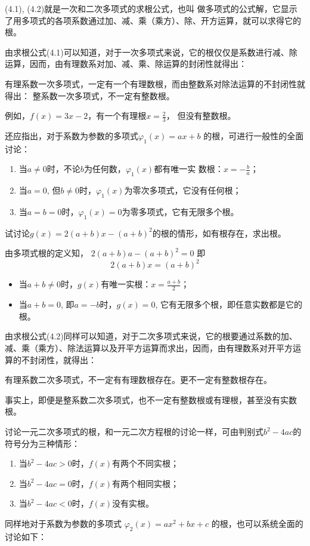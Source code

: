 (4.1), (4.2)就是一次和二次多项式的求根公式，也叫
做多项式的公式解，它显示了用多项式的各项系数通过加、减、乘（乘方）、除、开方运算，就可以求得它的根。

由求根公式(4.1)可以知道，对于一次多项式来说，它的根仅仅是系数进行减、除运算，因而，由有理数系对加、减、乘、除运算的封闭性就得出：

有理系数一次多项式，一定有一个有理数根，而由整数系对除法运算的不封闭性就得出：
整系数一次多项式，不一定有整数根。

例如，$f(x)=3x-2$，有一个有理根$x=\frac{2}{3}$，
但没有整数根。

还应指出，对于系数为参数的多项式$\varphi_1(x)=ax+b$
的根，可进行一般性的全面讨论：
\begin{enumerate}
    \item 当$a\ne 0$时，不论$b$为任何数，$\varphi_1(x)$都有唯一实
    数根：$x=-\frac{b}{a}$；
    \item 当$a=0$, 但$b\ne 0$时，$\varphi_1(x)$为零次多项式，它没有任何根；
    \item 当$a=b=0$时，$\varphi_1(x)=0$为零多项式，它有无限多个根。
\end{enumerate}

\begin{example}
    试讨论$g(x)=2(a+b)x-(a+b)^2$的根的情形，如有根存在，求出根。
\end{example}

\begin{solution}
    由多项式根的定义知，
$2 (a+b) a- (a+b)^2=0$
即
\[2 (a+b) x= (a+b)^2\]
\begin{itemize}
    \item 当$a+b\ne 0$时，$g(x)$有唯一实根：$x=\frac{a+b}{2}$；
    \item 当$a+b=0$, 即$a=-b$时，$g(x)=0$, 它有无限多个根，即任意实数都是它的根。
\end{itemize}
\end{solution}

由求根公式(4.2)同样可以知道，对于二次多项式来说，它的根要通过系数的加、减、乘（乘方）、除法运算以及开平方运算而求出，因而，由有理数系对开平方运算的不封闭性，就得出：

有理系数二次多项式，不一定有有理数根存在。更不一定有整数根存在。

事实上，即便是整系数二次多项式，也不一定有整数根或有理根，甚至没有实数根。

讨论一元二次多项式的根，和一元二次方程根的讨论一样，可由判别式$b^2-4ac$的符号分为三种情形：
\begin{enumerate}
    \item 当$b^2-4ac>0$时，$f(x)$有两个不同实根；
    \item 当$b^2-4ac=0$时，$f(x)$有两个相同实根；
    \item 当$b^2-4ac<0$时，$f(x)$没有实根。
\end{enumerate}

同样地对于系数为参数的多项式
$\varphi_2 (x) =ax^2+bx+c$
的根，也可以系统全面的讨论如下：













